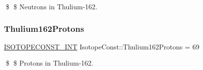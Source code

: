 \$ \$ Neutrons in Thulium-\/162. \mbox{\label{group___isotope_const-_thulium-_tm162_ga8a3640d181690889be8ff47b9e573c91}} 
\subsubsection{\texorpdfstring{Thulium162\+Protons}{Thulium162Protons}}
{\footnotesize\ttfamily \mbox{\hyperlink{group___isotope_const-_macros_ga5f18360b3e99483a35c32d789e62621c}{I\+S\+O\+T\+O\+P\+E\+C\+O\+N\+S\+T\+\_\+\+I\+NT}} Isotope\+Const\+::\+Thulium162\+Protons = 69}

\$ \$ Protons in Thulium-\/162. 